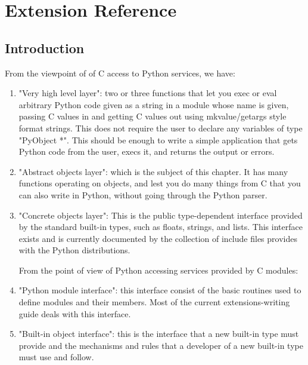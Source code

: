 \newcommand{\NULL}{\code{NULL}}

\chapter{Extension Reference}

\section{Introduction}

From the viewpoint of of C access to Python services, we have:

\begin{enumerate}
  \item "Very high level layer": two or three functions that let you exec or
    eval arbitrary Python code given as a string in a module whose name is
    given, passing C values in and getting C values out using
    mkvalue/getargs style format strings.  This does not require the user
    to declare any variables of type "PyObject *".  This should be enough
    to write a simple application that gets Python code from the user,
    execs it, and returns the output or errors.

  \item "Abstract objects layer": which is the subject of this chapter.
    It has many functions operating on objects, and lest you do many
    things from C that you can also write in Python, without going
    through the Python parser.

  \item "Concrete objects layer": This is the public type-dependent
    interface provided by the standard built-in types, such as floats,
    strings, and lists.  This interface exists and is currently
    documented by the collection of include files provides with the
    Python distributions.

  From the point of view of Python accessing services provided by C
  modules: 

  \item "Python module interface": this interface consist of the basic
    routines used to define modules and their members.  Most of the
    current extensions-writing guide deals with this interface.

  \item "Built-in object interface": this is the interface that a new
    built-in type must provide and the mechanisms and rules that a
    developer of a new built-in type must use and follow.
\end{enumerate}


